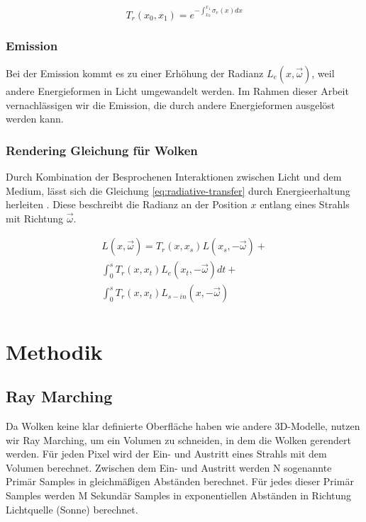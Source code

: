 \begin{equation}
    T_r(x_0, x_1) = e^{-\int_{x_0}^{x_1} \sigma_e(x) dx}
    \label{eq:transmittance}
\end{equation}

\subsubsection{Emission}
Bei der Emission kommt es zu einer Erhöhung der Radianz $ L_e(x, \vec{\omega}) $, weil andere Energieformen in Licht umgewandelt werden. Im Rahmen dieser Arbeit vernachlässigen wir die Emission, die durch andere Energieformen ausgelöst werden kann.

\subsubsection{Rendering Gleichung für Wolken}
Durch Kombination der Besprochenen Interaktionen zwischen Licht und dem Medium, lässt sich die Gleichung \ref{eq:radiative-transfer} durch Energieerhaltung herleiten \cite{Högfeldt16}. Diese beschreibt die Radianz an der Position $ x $ entlang eines Strahls mit Richtung $ \vec{\omega} $.

\begin{multline}
    L(x, \vec{\omega}) =
    T_r(x, x_s) L(x_s, -\vec{\omega}) +\\
    \int_{0}^{s} T_r(x, x_t) L_e(x_t, -\vec{\omega}) dt +\\
    \int_{0}^{s} T_r(x, x_t) L_{s-in}(x, -\vec{\omega})\\
    \label{eq:radiative-transfer}
\end{multline}

\section{Methodik}
\label{sec:method}

\subsection{Ray Marching}
Da Wolken keine klar definierte Oberfläche haben wie andere 3D-Modelle, nutzen wir Ray Marching, um ein Volumen zu schneiden, in dem die Wolken gerendert werden. Für jeden Pixel wird der Ein- und Austritt eines Strahls mit dem Volumen berechnet. Zwischen dem Ein- und Austritt werden N sogenannte Primär Samples in gleichmäßigen Abständen berechnet. Für jedes dieser Primär Samples werden M Sekundär Samples in exponentiellen Abständen in Richtung Lichtquelle (Sonne) berechnet.

